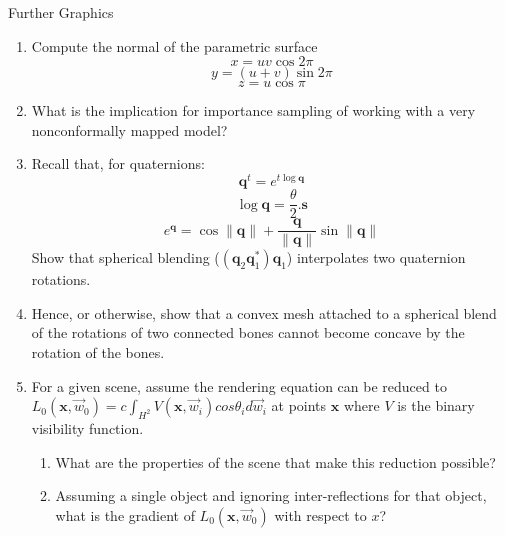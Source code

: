 \documentclass{tripos}
\begin{document}
\begin{question}[MockIA,year=2025,paper=2,question=7,author=nobody]{Further Graphics}
  \begin{enumerate}
\item Compute the normal of the parametric surface
  \[
  x = uv\cos2\pi
  \]
  \[
  y = (u+v)\sin 2\pi
  \]
  \[
  z = u\cos \pi
  \]

\item What is the implication for importance sampling of working with a very nonconformally mapped model?
\item Recall that, for quaternions:
  \[
  \mathbf{q}^t = e^{t \log \mathbf{q}}
  \]
  \[
  \log \mathbf{q} = \frac{\theta}{2}.\mathbf{s}
  \]
  \[
  e^{\mathbf{q}} = \cos \|\mathbf{q}\| + \frac{\mathbf{q}}{\|\mathbf{q}\|}\sin \|\mathbf{q}\|
  \]
  Show that spherical blending ($(\mathbf{q}_2\mathbf{q}_1^*)\mathbf{q}_1$) interpolates two quaternion rotations. 

\item Hence, or otherwise, show that a convex mesh attached to a spherical blend of the rotations of two connected bones cannot become concave by the rotation of the bones.

\item For a given scene, assume the rendering equation can be reduced to $L_0(\mathbf{x}, \vec{w}_0) = c \int_{H^2} V(\mathbf{x}, \vec{w}_i)cos \theta_i d\vec{w}_i$ at points $\mathbf{x}$ where $V$ is the binary visibility function.
  \begin{enumerate}
  \item What are the properties of the scene that make this reduction possible? 
  \item Assuming a single object and ignoring inter-reflections for that object, what
    is the gradient of $L_0(\mathbf{x}, \vec{w}_0)$ with respect to $x$? 
  \end{enumerate}  
\end{enumerate}

\end{question}
\end{document}
